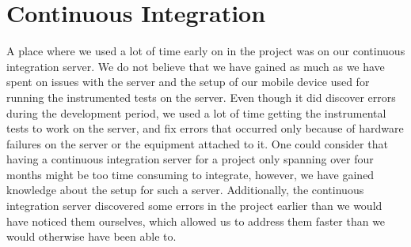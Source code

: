 
\newpage
\section{Continuous Integration}
A place where we used a lot of time early on in the project was on our continuous integration server. We do not believe that we have gained as much as we have spent on issues with the server and the setup of our mobile device used for running the instrumented tests on the server.  Even though it did discover errors during the development period, we used a lot of time getting the instrumental tests to work on the server, and fix errors that occurred only because of hardware failures on the server or the equipment attached to it. One could consider that having a continuous integration server for a project only spanning over four months might be too time consuming to integrate, however, we have gained knowledge about the setup for such a server. Additionally, the continuous integration server discovered some errors in the project earlier than we would have noticed them ourselves, which allowed us to address them faster than we would otherwise have been able to. 
